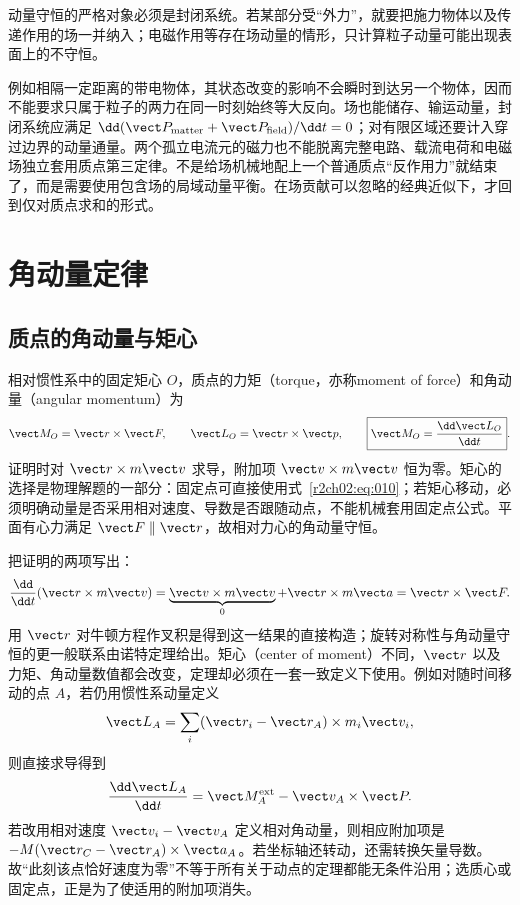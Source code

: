 动量守恒的严格对象必须是封闭系统。若某部分受“外力”，就要把施力物体以及传递作用的场一并纳入；电磁作用等存在场动量的情形，只计算粒子动量可能出现表面上的不守恒。

例如相隔一定距离的带电物体，其状态改变的影响不会瞬时到达另一个物体，因而不能要求只属于粒子的两力在同一时刻始终等大反向。场也能储存、输运动量，封闭系统应满足 $\dd(\vect P_{\rm matter}+\vect P_{\rm field})/\dd t=0$；对有限区域还要计入穿过边界的动量通量。两个孤立电流元的磁力也不能脱离完整电路、载流电荷和电磁场独立套用质点第三定律。不是给场机械地配上一个普通质点“反作用力”就结束了，而是需要使用包含场的局域动量平衡。在场贡献可以忽略的经典近似下，才回到仅对质点求和的形式。

\section{角动量定律}
\label{r2ch02:sec:angular}

\subsection{质点的角动量与矩心}
\label{r2ch02:sec:point-angular}

相对惯性系中的固定矩心 $O$，质点的力矩（torque，亦称moment of force）和角动量（angular momentum）为
\begin{equation}
 \vect M_O=\vect r\times\vect F,\qquad
 \vect L_O=\vect r\times\vect p,\qquad
 \boxed{\vect M_O=\frac{\dd\vect L_O}{\dd t}}.
 \label{r2ch02:eq:010}
\end{equation}
证明时对 $\vect r\times m\vect v$ 求导，附加项 $\vect v\times m\vect v$ 恒为零。矩心的选择是物理解题的一部分：固定点可直接使用式~\eqref{r2ch02:eq:010}；若矩心移动，必须明确动量是否采用相对速度、导数是否跟随动点，不能机械套用固定点公式。平面有心力满足 $\vect F\parallel\vect r$，故相对力心的角动量守恒。

把证明的两项写出：
\[
 \frac{\dd}{\dd t}(\vect r\times m\vect v)
 =\underbrace{\vect v\times m\vect v}_{0}
 +\vect r\times m\vect a
 =\vect r\times\vect F.
\]
用 $\vect r$ 对牛顿方程作叉积是得到这一结果的直接构造；旋转对称性与角动量守恒的更一般联系由诺特定理给出。矩心（center of moment）不同，$\vect r$ 以及力矩、角动量数值都会改变，定理却必须在一套一致定义下使用。例如对随时间移动的点 $A$，若仍用惯性系动量定义
\[
 \vect L_A=\sum_i(\vect r_i-\vect r_A)\times m_i\vect v_i,
\]
则直接求导得到
\[
 \frac{\dd\vect L_A}{\dd t}
 =\vect M_A^{\rm ext}-\vect v_A\times\vect P.
\]
若改用相对速度 $\vect v_i-\vect v_A$ 定义相对角动量，则相应附加项是
$-M(\vect r_C-\vect r_A)\times\vect a_A$。若坐标轴还转动，还需转换矢量导数。故“此刻该点恰好速度为零”不等于所有关于动点的定理都能无条件沿用；选质心或固定点，正是为了使适用的附加项消失。

